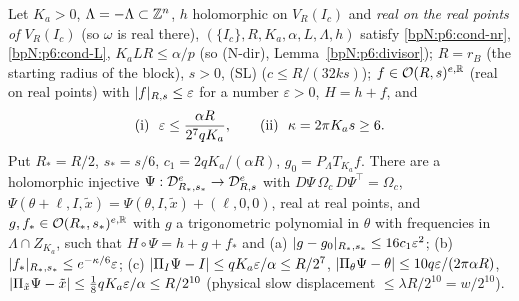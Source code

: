 \begin{theorem}\label{bpN:p11:nf}
Let $K_a>0$, $\Lambda=-\Lambda\subset\mathbb{Z}^n$, $h$ holomorphic on $V_R(I_c)$ and \emph{real on the real points of $V_R(I_c)$} (so $\omega$ is real there), $(\{I_c\},R,K_a,\alpha,L,\Lambda,h)$ satisfy \ref{bpN:p6:cond-nr}, \ref{bpN:p6:cond-L}, $K_aLR\le\alpha/p$ (so (N-dir), Lemma~\ref{bpN:p6:divisor}); $R=r_B$ (the starting radius of the block), $s>0$, \textup{(SL)} ($c\le R/(32ks)$); $f\in\mathcal O(R,s)^{e,\mathbb{R}}$ (real on real points) with $\lvert f\rvert_{R,s}\le\varepsilon$ for a number $\varepsilon>0$, $H=h+f$, and
\[\textup{(i)}\ \ \varepsilon\le\frac{\alpha R}{2^7qK_a},\qquad\textup{(ii)}\ \ \kappa=2\pi K_as\ge6 .\]
Put $R_*=R/2$, $s_*=s/6$, $c_1=2qK_a/(\alpha R)$, $g_0=P_\Lambda T_{K_a}f$. There are a holomorphic injective $\Psi:\mathcal D_{R_*,s_*}^e\to\mathcal D_{R,s}^e$ with $D\Psi\,\Omega_c\,D\Psi^\top=\Omega_c$, $\Psi(\theta+\ell,I,\tilde x)=\Psi(\theta,I,\tilde x)+(\ell,0,0)$, real at real points, and $g,f_*\in\mathcal O(R_*,s_*)^{e,\mathbb{R}}$ with $g$ a trigonometric polynomial in $\theta$ with frequencies in $\Lambda\cap Z_{K_a}$, such that $H\circ\Psi=h+g+f_*$ and
(a) $\lvert g-g_0\rvert_{R_*,s_*}\le16c_1\varepsilon^2$; (b) $\lvert f_*\rvert_{R_*,s_*}\le e^{-\kappa/6}\varepsilon$; (c) $\lvert \Pi_I\Psi-I\rvert\le qK_a\varepsilon/\alpha\le R/2^7$, $\lvert \Pi_\theta\Psi-\theta\rvert\le10q\varepsilon/(2\pi\alpha R)$, $\lvert \Pi_{\tilde x}\Psi-\tilde x\rvert\le\frac18qK_a\varepsilon/\alpha\le R/2^{10}$ (physical slow displacement $\le\lambda R/2^{10}=w/2^{10}$).
\end{theorem}
